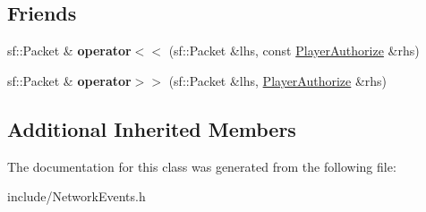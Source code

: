 \subsection*{Friends}
\begin{DoxyCompactItemize}
\item 
\hypertarget{class_player_authorize_a4fee62309b339ef3a35b0b73b70c59bf}{sf\-::\-Packet \& {\bfseries operator$<$$<$} (sf\-::\-Packet \&lhs, const \hyperlink{class_player_authorize}{Player\-Authorize} \&rhs)}\label{class_player_authorize_a4fee62309b339ef3a35b0b73b70c59bf}

\item 
\hypertarget{class_player_authorize_acee74d959a3c4c433ff2ece312ddae0e}{sf\-::\-Packet \& {\bfseries operator$>$$>$} (sf\-::\-Packet \&lhs, \hyperlink{class_player_authorize}{Player\-Authorize} \&rhs)}\label{class_player_authorize_acee74d959a3c4c433ff2ece312ddae0e}

\end{DoxyCompactItemize}
\subsection*{Additional Inherited Members}


The documentation for this class was generated from the following file\-:\begin{DoxyCompactItemize}
\item 
include/Network\-Events.\-h\end{DoxyCompactItemize}
